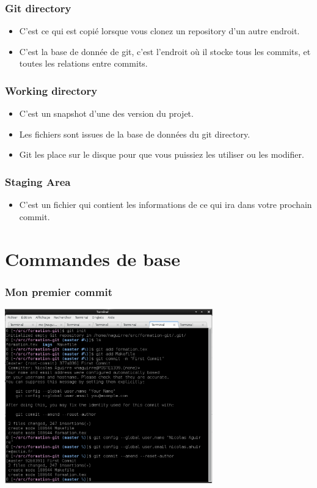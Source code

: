 \documentclass{beamer}
\begin{document}
  \begin{frame}
     \frametitle{Git directory}
     \begin{itemize}
     \item C'est ce qui est copié lorsque vous clonez un repository d'un autre endroit.
     \item C'est la base de donnée de git, c'est l'endroit où il stocke tous les commits, et toutes les relations entre commits.
     \end{itemize}
   \end{frame}

  \begin{frame}
     \frametitle{Working directory}
     \begin{itemize}
     \item C'est un snapshot d'une des version du projet.
     \item Les fichiers sont issues de la base de données du git directory.
     \item Git les place sur le disque pour que vous puissiez les utiliser ou les modifier.
     \end{itemize}
   \end{frame}

  \begin{frame}
     \frametitle{Staging Area}
     \begin{itemize}
     \item C'est un fichier qui contient les informations de ce qui ira dans votre prochain commit.
     \end{itemize}
   \end{frame}


\section{Commandes de base}

  \begin{frame}
     \frametitle{Mon premier commit}
     \begin{center}
       \includegraphics[width=9cm]{imgs/first_commit.eps}
     \end{center}
  \end{frame}
\end{document}
